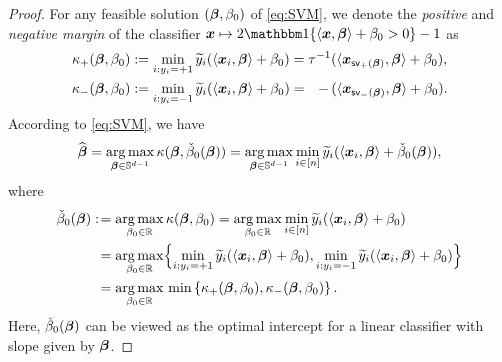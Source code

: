\begin{proof}
	For any feasible solution $({\boldsymbol{\beta}}, \beta_0)$ of \cref{eq:SVM}, we denote the \emph{positive} and \emph{negative margin} of the classifier $\xx \mapsto 2\ind\{\< \xx, \vbeta \> + \beta_0 > 0 \}  -1$ as
	\begin{equation}\label{eq:margin_pm}
		\begin{aligned}
			\kappa_{+}(\vbeta, \beta_0)
			& := \min_{i: y_i = +1}\wt y_i(\< \xx_i, \vbeta \> + \beta_0)
			= \tau^{-1}(\< \xx_{\mathsf{sv}_+(\vbeta)}, \vbeta \> + \beta_0),  
			\\
			\kappa_{-}(\vbeta, \beta_0)
			& := \min_{i: y_i = -1}\wt y_i(\< \xx_i, \vbeta \> + \beta_0)
			= \mathmakebox[\widthof{$\tau^{-1}$}][r]{-\,} (\< \xx_{\mathsf{sv}_-(\vbeta)}, \vbeta \> + \beta_0).
		\end{aligned}
	\end{equation}
    According to \cref{eq:SVM}, we have
	\begin{equation*}
		\widehat{{\boldsymbol{\beta}}} = \operatorname*{arg\,max}_{{\boldsymbol{\beta}} \in \mathbb{S}^{d-1}} \kappa({\boldsymbol{\beta}}, \check\beta_0({\boldsymbol{\beta}})) = \operatorname*{arg\,max}_{{\boldsymbol{\beta}} \in \mathbb{S}^{d-1}} \min_{i \in [n]} \widetilde{y}_i ( \langle \text{\boldmath $x$}_i, \text{\boldmath $\beta$} \rangle + \check\beta_0({\boldsymbol{\beta}}) ),
	\end{equation*}
	where
	\begin{equation}
		\label{eq:beta0_optim}
		\begin{aligned}
			\check\beta_0({\boldsymbol{\beta}}) 
		: \! & = \operatorname*{arg\,max}_{\beta_0 \in \mathbb{R}} \kappa({\boldsymbol{\beta}}, \beta_0)
		= \operatorname*{arg\,max}_{\beta_0 \in \mathbb{R}} \min\limits_{i \in [n]} \widetilde{y}_i ( \langle \text{\boldmath $x$}_i, \text{\boldmath $\beta$} \rangle + \beta_0 ) \\
		& = \operatorname*{arg\,max}_{\beta_0 \in \mathbb{R}} \Bigl\{ \min_{i: y_i = +1}\widetilde y_i(\langle \text{\boldmath $x$}_i, {\boldsymbol{\beta}} \rangle + \beta_0), \min_{i: y_i = -1}\widetilde y_i(\langle \text{\boldmath $x$}_i, {\boldsymbol{\beta}} \rangle + \beta_0) \Bigr\}
		\\
		& = \operatorname*{arg\,max}_{\beta_0 \in \mathbb{R}} \, \min\left\{ 
			\kappa_{+}({\boldsymbol{\beta}}, \beta_0),
			\kappa_{-}({\boldsymbol{\beta}}, \beta_0)
		 \right\}.
		\end{aligned}
	\end{equation}
	Here, $\check\beta_0({\boldsymbol{\beta}})$ can be viewed as the optimal intercept for a linear classifier with slope given by ${\boldsymbol{\beta}}$. 
	

\end{proof}
